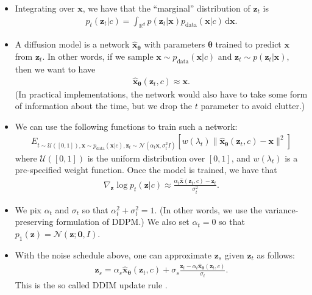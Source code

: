 \documentclass[10pt]{article}
\newcommand{\dee}{\mathrm{d}}
\newcommand{\ve}[1]{\mathbf{#1}}
\newcommand{\ves}[1]{\boldsymbol{#1}}
\newcommand{\mcal}[1]{\mathcal{#1}}
\newcommand{\Real}{\mathbb{R}}
\newcommand{\data}{\mathrm{data}}
\begin{document}
\begin{itemize}
  \item Integrating over $\ve{x}$, we have that the ``marginal'' distribution of $\ve{z}_t$ is
  \begin{align*}
    p_t(\ve{z}_t|c) = \int_{\Real^d} p(\ve{z}_t|\ve{x}) p_{\data}(\ve{x}|c)\, \dee\ve{x}.
  \end{align*}

  \item A diffusion model is a network $\hat{\ve{x}}_{\ves{\theta}}$ with parameters $\ves{\theta}$ trained to predict $\ve{x}$ from $\ve{z}_t$. In other words, if we sample $\ve{x} \sim p_{\data}(\ve{x}|c)$ and $\ve{z}_t \sim p(\ve{z}_t|\ve{x})$, then we want to have
  \begin{align*}
    \hat{\ve{x}}_{\ves{\theta}}(\ve{z}_t, c) \approx \ve{x}.
  \end{align*}
  (In practical implementations, the network would also have to take some form of information about the time, but we drop the $t$ parameter to avoid clutter.)

  \item We can use the following functions to train such a network:
  \begin{align*}
    E_{t \sim \mcal{U}([0,1]), \ve{x} \sim p_{\data}(\ve{x}|c), \ve{z}_t \sim \mcal{N}(\alpha_t \ve{x}, \sigma_t^2 I)} [w(\lambda_t) \| \hat{\ve{x}}_{\ves{\theta}}(\ve{z}_t, c) - \ve{x} \|^2 ]    
  \end{align*}
  where $\mcal{U}([0,1])$ is the uniform distribution over $[0,1]$, and $w(\lambda_t)$ is a pre-specified weight function. Once the model is trained, we have that
  \begin{align*}
    \nabla_{\ve{z}} \log p_t(\ve{z}|c) \approx \frac{\alpha_t \hat{\ve{x}}(\ve{z}_t,c) - \ve{z}_t}{\sigma_t^2}.
  \end{align*}
  
  \item We pix $\alpha_t$ and $\sigma_t$ so that $\alpha_t^2 + \sigma_t^2 = 1$. (In other words, we use the variance-preserving formulation of DDPM.) We also set $\alpha_t = 0$ so that $p_1(\ve{z}) = \mcal{N}(\ve{z};\ve{0}, I)$. 
  
  \item With the noise schedule above, one can approximate $\ve{z}_s$ given $\ve{z}_t$ as follows:
  \begin{align*}
    \ve{z}_s = \alpha_s \hat{\ve{x}}_{\ves{\theta}}(\ve{z}_t, c) + \sigma_s \frac{\ve{z}_t - \alpha_t \hat{\ve{x}}_{\ves{\theta}}(\ve{z}_t, c) }{\sigma_t}.
  \end{align*}
  This is the so called DDIM update rule \cite{Song:2021}.


\end{itemize}
\end{document}
